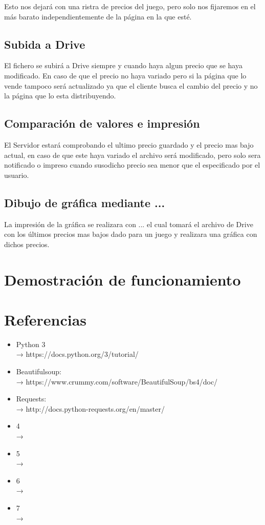 \documentclass[12pt,letterpaper]{article}
\begin{document}
				Esto nos dejará con una ristra de precios del juego, pero solo nos fijaremos en el más barato independientemente de la página en la que esté.
			\subsection{Subida a Drive}
				El fichero se subirá a Drive siempre y cuando haya algun precio que se haya modificado. En caso de que el precio no haya variado pero si la página que lo vende tampoco será actualizado ya que el cliente busca el cambio del precio y no la página que lo esta distribuyendo. 
			\subsection{Comparación de valores e impresión}
				El Servidor estará comprobando el ultimo precio guardado y el precio mas bajo actual, en caso de que este haya variado el archivo será modificado, pero solo sera notificado o impreso cuando susodicho precio sea menor que el especificado por el usuario.
			\subsection{Dibujo de gráfica mediante ...}
				La impresión de la gráfica se realizara con ... el cual tomará el archivo de Drive con los últimos precios mas bajos dado para un juego y realizara una gráfica con dichos precios.
		\newpage	
		\section{Demostración de funcionamiento}
		\newpage
		\section{Referencias}
			\begin{itemize}
				\item Python 3\\→ https://docs.python.org/3/tutorial/
				\item Beautifulsoup:\\→ https://www.crummy.com/software/BeautifulSoup/bs4/doc/\\
				\item Requests: \\→ http://docs.python-requests.org/en/master/
				\item 4\\→
				\item 5\\→
				\item 6\\→
				\item 7\\→
			\end{itemize}
		\newpage
\end{document}
